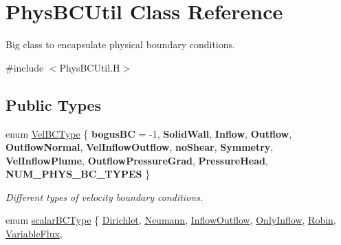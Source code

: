 \hypertarget{class_phys_b_c_util}{}\section{Phys\+B\+C\+Util Class Reference}
\label{class_phys_b_c_util}


Big class to encapsulate physical boundary conditions.  




{\ttfamily \#include $<$Phys\+B\+C\+Util.\+H$>$}

\subsection*{Public Types}
\begin{DoxyCompactItemize}
\item 
enum \hyperlink{class_phys_b_c_util_a1aaacd3006840779878dc6287355a358}{Vel\+B\+C\+Type} \{ \newline
{\bfseries bogus\+BC} = -\/1, 
{\bfseries Solid\+Wall}, 
{\bfseries Inflow}, 
{\bfseries Outflow}, 
\newline
{\bfseries Outflow\+Normal}, 
{\bfseries Vel\+Inflow\+Outflow}, 
{\bfseries no\+Shear}, 
{\bfseries Symmetry}, 
\newline
{\bfseries Vel\+Inflow\+Plume}, 
{\bfseries Outflow\+Pressure\+Grad}, 
{\bfseries Pressure\+Head}, 
{\bfseries N\+U\+M\+\_\+\+P\+H\+Y\+S\+\_\+\+B\+C\+\_\+\+T\+Y\+P\+ES}
 \}\begin{DoxyCompactList}\small\item\em Different types of velocity boundary conditions. \end{DoxyCompactList}
\item 
enum \hyperlink{class_phys_b_c_util_a1beb9821cf9e783e3742b82b7070c97a}{scalar\+B\+C\+Type} \{ \newline
\hyperlink{class_phys_b_c_util_a1beb9821cf9e783e3742b82b7070c97aa3c458c6b8958fb7d8f8f575725a0e91c}{Dirichlet}, 
\hyperlink{class_phys_b_c_util_a1beb9821cf9e783e3742b82b7070c97aae1ec2629a88cd0c687f102296e995d6b}{Neumann}, 
\hyperlink{class_phys_b_c_util_a1beb9821cf9e783e3742b82b7070c97aae85fc8bb407faa51331a6602f82577b7}{Inflow\+Outflow}, 
\hyperlink{class_phys_b_c_util_a1beb9821cf9e783e3742b82b7070c97aa3f9f8b4486f10b1ae3cef04b812d882f}{Only\+Inflow}, 
\newline
\hyperlink{class_phys_b_c_util_a1beb9821cf9e783e3742b82b7070c97aac2ad2d100c936a132b4926e2bc78d9ee}{Robin}, 
\hyperlink{class_phys_b_c_util_a1beb9821cf9e783e3742b82b7070c97aaee840c89caeb958ad0ba78c66646d323}{Variable\+Flux}, 

\end{DoxyCompactItemize}
